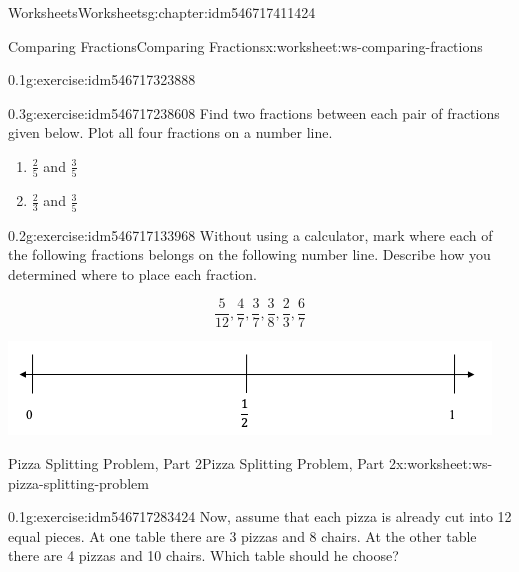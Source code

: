 \documentclass[twoside,11pt,]{book}
\begin{document}
\begin{chapterptx}{Worksheets}{}{Worksheets}{}{}{g:chapter:idm546717411424}
\begin{worksheet-section-numberless}{Comparing Fractions}{}{Comparing Fractions}{}{}{x:worksheet:ws-comparing-fractions}
\begin{divisionexercise}{3}{}{0.1}{g:exercise:idm546717323888}
\end{divisionexercise}%
\clearpage
\begin{divisionexercise}{4}{}{0.3}{g:exercise:idm546717238608}%
Find two fractions between each pair of fractions given below. Plot all four fractions on a number line.%
%
\begin{enumerate}[label=(\alph*)]
\item{}\(\frac{2}{5} \) and \(\frac{3}{5} \)%
\item{}\(\frac{2}{3} \) and \(\frac{3}{5} \)%
\end{enumerate}
\end{divisionexercise}%
\begin{divisionexercise}{5}{}{0.2}{g:exercise:idm546717133968}%
Without using a calculator, mark where each of the following fractions belongs on the following number line. Describe how you determined where to place each fraction.%
\par
%
\begin{equation*}
\frac{5}{12} , \frac{4}{7} , \frac{3}{7} , \frac{3}{8} , \frac{2}{3} , \frac{6}{7} 
\end{equation*}
%
\begin{sidebyside}{1}{0.05}{0.05}{0}%
\begin{sbspanel}{0.9}%
\includegraphics[width=1\linewidth]{images/number-line-half-one.png}
\end{sbspanel}%
\end{sidebyside}%
\end{divisionexercise}%
\end{worksheet-section-numberless}
\restoregeometry
%
%
\typeout{************************************************}
\typeout{************************************************}
%
\begin{worksheet-section-numberless}{Pizza Splitting Problem, Part 2}{}{Pizza Splitting Problem, Part 2}{}{}{x:worksheet:ws-pizza-splitting-problem}
\begin{divisionexercise}{1}{}{0.1}{g:exercise:idm546717283424}%
Now, assume that each pizza is already cut into 12 equal pieces. At one table there are 3 pizzas and 8 chairs.  At the other table there are 4 pizzas and 10 chairs.  Which table should he choose?%

\end{divisionexercise}
\end{worksheet-section-numberless}
\end{chapterptx}
\end{document}
